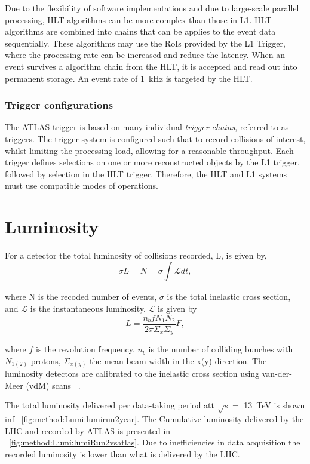 Due to the flexibility of software implementations and due to large-scale parallel processing, HLT algorithms can be more complex than those in L1. HLT algorithms are combined into chains that can be applies to the event data sequentially. These algorithms may use the RoIs provided by the L1 Trigger, where the processing rate can be increased and reduce the latency. When an event survives a algorithm chain from the HLT, it is accepted and read out into permanent storage. An event rate of \SI{1}{\kilo\hertz} is targeted by the HLT.

\subsubsection{Trigger configurations}

The ATLAS trigger is based on many individual \emph{trigger chains}, referred to as triggers. The trigger system is configured such that to record collisions of interest, whilst limiting the processing load, allowing for a reasonable throughput. Each trigger defines selections on one or more reconstructed objects by the L1 trigger, followed by selection in the HLT trigger. Therefore, the HLT and L1 systems must use compatible modes of operations. 

\section{Luminosity}\label{sec:method:lumi}

For a detector the total luminosity of collisions recorded, L, is given by, 
\begin{equation}
   \sigma L = N = \sigma \int_{}^{} \mathcal{L} dt,
\end{equation}

where N is the recoded number of events, $\sigma$ is the total inelastic cross section, and $\mathcal{L}$ is the instantaneous luminosity. $\mathcal{L}$ is given by~\cite{Herr}
\begin{equation}
    L = \frac{n_b f N_1 N_2 }{2\pi \Sigma_{x} \Sigma_{y}} F,
\end{equation}

where $f$ is the revolution frequency, $n_b$ is the number of colliding bunches with $N_{1(2)}$ protons, $\Sigma_{x(y)}$ the mean beam width in the x(y) direction. The luminosity detectors are calibrated to the inelastic cross section using van-der-Meer (vdM) scans ~\cite{ATLAS:Balagura_2011,ATLAS:vanderMeer:296752}.

The total luminosity delivered per data-taking period att $\sqrt{s} = $ \SI{13}{\tera\electronvolt} is shown inf ~\cref{fig:method:Lumi:lumirun2year}. The Cumulative luminosity delivered by the LHC and recorded by ATLAS is presented in ~\cref{fig:method:Lumi:lumiRun2vsatlas}. Due to inefficiencies in data acquisition the recorded luminosity is lower than what is delivered by the LHC. 

